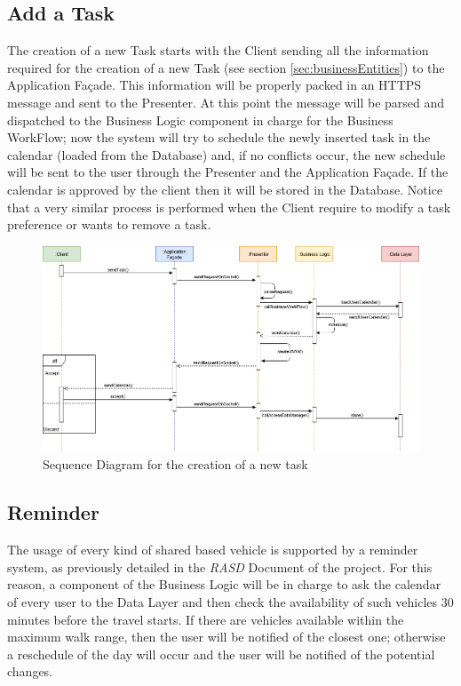 \subsection{Add a Task}
The creation of a new Task starts with the Client sending all the information required for the creation of a new Task (see section \ref{sec:businessEntities}) to the Application Façade. This information will be properly packed in an HTTPS message and sent to the Presenter. At this point the message will be parsed and dispatched to the Business Logic component in charge for the Business WorkFlow; now the system will try to schedule the newly inserted task in the calendar (loaded from the Database) and, if no conflicts occur, the new schedule will be sent to the user through the Presenter and the Application Façade. If the calendar is approved by the client then it will be stored in the Database.
Notice that a very similar process is performed when the Client require to modify a task preference or wants to remove a task. 

\begin{figure}[H]
    \centering
    \includegraphics[scale=0.4]{Pictures/RunTimeView/addTask.png}
    \caption{Sequence Diagram for the creation of a new task}
    \label{fig:sequenceAddTask}
\end{figure}

\subsection{Reminder}
The usage of every kind of shared based vehicle is supported by a reminder system, as previously detailed in the \emph{RASD} Document of the project. For this reason, a component of the Business Logic will be in charge to ask the calendar of every user to the Data Layer and then check the availability of such vehicles 30 minutes before the travel starts. If there are vehicles available within the maximum walk range, then the user will be notified of the closest one; otherwise a reschedule of the day will occur and the user will be notified of the potential changes. 



